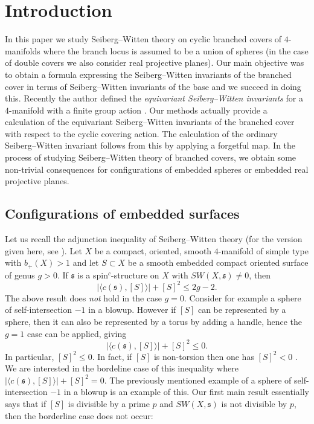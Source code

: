 \documentclass{amsart}
\theoremstyle{definition}
\theoremstyle{remark}
\numberwithin{equation}{section}
\begin{document}


\section{Introduction}

In this paper we study Seiberg--Witten theory on cyclic branched covers of $4$-manifolds where the branch locus is assumed to be a union of spheres (in the case of double covers we also consider real projective planes). Our main objective was to obtain a formula expressing the Seiberg--Witten invariants of the branched cover in terms of Seiberg--Witten invariants of the base and we succeed in doing this. Recently the author defined the {\em equivariant Seiberg--Witten invariants} for a $4$-manifold with a finite group action \cite{bar}. Our methods actually provide a calculation of the equivariant Seiberg--Witten invariants of the branched cover with respect to the cyclic covering action. The calculation of the ordinary Seiberg--Witten invariant follows from this by applying a forgetful map. In the process of studying Seiberg--Witten theory of branched covers, we obtain some non-trivial consequences for configurations of embedded spheres or embedded real projective planes.


\subsection{Configurations of embedded surfaces}\label{sec:config}

Let us recall the adjunction inequality of Seiberg--Witten theory (for the version given here, see \cite[Corollary 1.7]{os2}). Let $X$ be a compact, oriented, smooth $4$-manifold of simple type with $b_+(X) > 1$ and let $S \subset X$ be a smooth embedded compact oriented surface of genus $g > 0$. If $\mathfrak{s}$ is a spin$^c$-structure on $X$ with $SW(X , \mathfrak{s}) \neq 0$, then
\[
| \langle c(\mathfrak{s}) , [S] \rangle | + [S]^2 \le 2g-2.
\]
The above result does {\em not} hold in the case $g=0$. Consider for example a sphere of self-intersection $-1$ in a blowup. However if $[S]$ can be represented by a sphere, then it can also be represented by a torus by adding a handle, hence the $g=1$ case can be applied, giving
\[
| \langle c(\mathfrak{s}) , [S] \rangle | + [S]^2 \le 0.
\]
In particular, $[S]^2 \le 0$. In fact, if $[S]$ is non-torsion then one has $[S]^2 < 0$ \cite[Lemma 5.1]{fs}. We are interested in the bordeline case of this inequality where $|\langle c(\mathfrak{s}) , [S] \rangle | + [S]^2 = 0$. The previously mentioned example of a sphere of self-intersection $-1$ in a blowup is an example of this. Our first main result essentially says that if $[S]$ is divisible by a prime $p$ and $SW(X , \mathfrak{s})$ is not divisible by $p$, then the borderline case does not occur:
\end{document}
